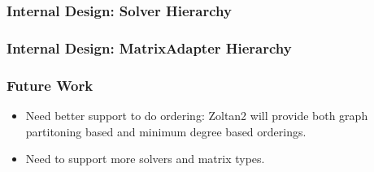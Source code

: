 \documentclass[xcolor=dvipsnames]{beamer}
\begin{document}
\begin{frame}
  \frametitle{Internal Design: Solver Hierarchy}
\end{frame}

\begin{frame}
  \frametitle{Internal Design: MatrixAdapter Hierarchy}
\end{frame}

\begin{frame}
  \frametitle{Future Work}
  \begin{itemize}
  \item Need better support to do ordering: Zoltan2 will provide both
    graph partitoning based and minimum degree based orderings.
  \item Need to support more solvers and matrix types.
  \end{itemize}
\end{frame}
\end{document}
